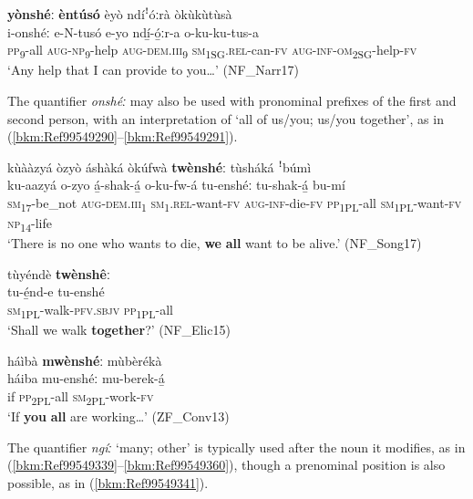 \ea
\label{bkm:Ref99549040}
\textbf{yònshéː} \textbf{èntúsó} èyò ndíꜝóːrà òkùkùtùsà\\
\gll i-onshéː  e-N-tusó e-yo    ndí̲-ó̲ːr-a    o-ku-ku-tus-a \\
\textsc{pp}\textsubscript{9}-all    \textsc{aug}-\textsc{np}\textsubscript{9}-help \textsc{aug}-\textsc{dem}.\textsc{iii}\textsubscript{9}  \textsc{sm}\textsubscript{1SG}.\textsc{rel}-can-\textsc{fv}  \textsc{aug}-\textsc{inf}-\textsc{om}\textsubscript{2SG}-help-\textsc{fv}\\
\glt ‘Any help that I can provide to you…’ (NF\_Narr17)
\z

The quantifier \textit{onshéː} may also be used with pronominal prefixes of the first and second person, with an interpretation of ‘all of us/you; us/you together’, as in (\ref{bkm:Ref99549290}--\ref{bkm:Ref99549291}).

\ea
\label{bkm:Ref99549290}
kùààzyá òzyò áshàká òkúfwà \textbf{twènshéː} tùsháká ꜝbúmì\\
\gll ku-aazyá  o-zyo    á̲-shak-á̲    o-ku-fw-á tu-enshéː  tu-shak-á̲    bu-mí \\
\textsc{sm}\textsubscript{17}-be\_not  \textsc{aug}-\textsc{dem}.\textsc{iii}\textsubscript{1}  \textsc{sm}\textsubscript{1}.\textsc{rel}-want-\textsc{fv}  \textsc{aug}-\textsc{inf}-die-\textsc{fv} \textsc{pp}\textsubscript{1PL}-all  \textsc{sm}\textsubscript{1PL}-want-\textsc{fv}  \textsc{np}\textsubscript{14}-life\\
\glt ‘There is no one who wants to die, \textbf{we} \textbf{all} want to be alive.’ (NF\_Song17)
\z

\ea
tùyéndè \textbf{twènshêː}\\
\gll tu-é̲nd-e      tu-enshé\\
\textsc{sm}\textsubscript{1PL}-walk-\textsc{pfv}.\textsc{sbjv}  \textsc{pp}\textsubscript{1PL}-all\\
\glt ‘Shall we walk \textbf{together}?’ (NF\_Elic15)
\z

\ea
\label{bkm:Ref99549291}
háìbà \textbf{mwènshéː} mùbèrékà\\
\gll háiba  mu-enshéː  mu-berek-á̲\\
if  \textsc{pp}\textsubscript{2PL}-all  \textsc{sm}\textsubscript{2PL}-work-\textsc{fv}\\
\glt ‘If \textbf{you} \textbf{all} are working…’ (ZF\_Conv13)
\z

The quantifier \textit{ngíː} ‘many; other’ is typically used after the noun it modifies, as in (\ref{bkm:Ref99549339}--\ref{bkm:Ref99549360}), though a prenominal position is also possible, as in (\ref{bkm:Ref99549341}).

